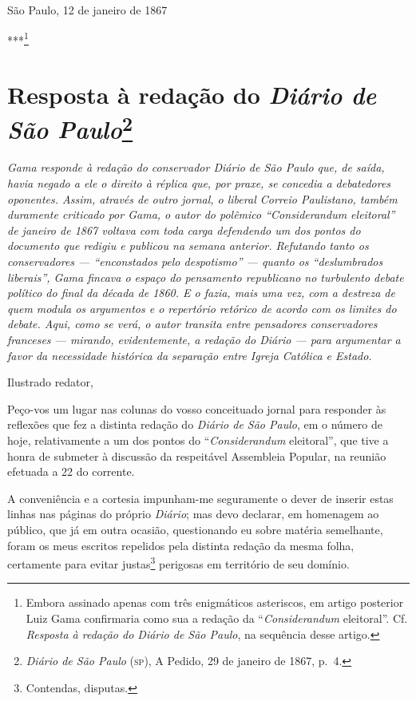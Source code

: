 \begin{flushright}
São Paulo, 12 de janeiro de 1867

***\footnote{Embora assinado apenas com três enigmáticos asteriscos,
  em artigo posterior Luiz Gama confirmaria como sua a redação da
  ``\textit{Considerandum} eleitoral''. Cf. \emph{Resposta à redação do Diário de
  São Paulo}, na sequência desse artigo.}
\end{flushright}

\chapter{Resposta à redação do \emph{Diário de São Paulo}\footnote{
  \emph{Diário de São Paulo} (\textsc{sp}), A Pedido, 29 de janeiro de 1867, p.~4.}}

\begin{didascalia}\itshape
Gama responde à redação do conservador \textnormal{Diário de São Paulo} que, de
saída, havia negado a ele o direito à réplica que, por praxe, se
concedia a debatedores oponentes. Assim, através de outro jornal, o
liberal \textnormal{Correio Paulistano}, também duramente criticado por Gama,
o autor do polêmico ``\textnormal{Considerandum} eleitoral'' de janeiro de 1867
voltava com toda carga defendendo um dos pontos do documento que redigiu
e publicou na semana anterior. Refutando tanto os conservadores ---
``enconstados pelo despotismo'' --- quanto os ``deslumbrados liberais'', Gama
fincava o espaço do pensamento republicano no turbulento debate político
do final da década de 1860. E o fazia, mais uma vez, com a destreza de
quem modula os argumentos e o repertório retórico de acordo com os
limites do debate. Aqui, como se verá, o autor transita entre pensadores
conservadores franceses --- mirando, evidentemente, a redação do \textnormal{Diário}
--- para argumentar a favor da necessidade histórica da separação
entre Igreja Católica e Estado.
\end{didascalia}



Ilustrado redator,

Peço-vos um lugar nas colunas do vosso conceituado jornal para responder
às reflexões que fez a distinta redação do \emph{Diário de São Paulo}, em
o número de hoje, relativamente a um dos pontos do ``\textit{Considerandum}
eleitoral'', que tive a honra de submeter à discussão da respeitável
Assembleia Popular, na reunião efetuada a 22 do corrente.

A conveniência e a cortesia impunham-me seguramente o dever de inserir
estas linhas nas páginas do próprio \emph{Diário}; mas devo declarar, em
homenagem ao público, que já em outra ocasião, questionando eu sobre
matéria semelhante, foram os meus escritos repelidos pela distinta
redação da mesma folha, certamente para evitar justas\footnote{
  Contendas, disputas.} perigosas em território de seu domínio.

